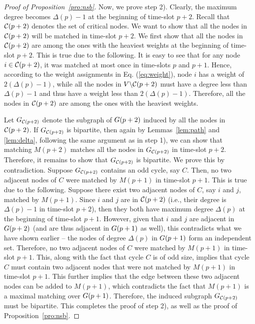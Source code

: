 \documentclass[10pt,journal,compsoc]{IEEEtran}
\begin{document}
\begin{proof}[Proof of Proposition~\ref{pro:nsb}]
Now, we prove step 2).
Clearly, the maximum degree becomes $\Delta(p)-1$ at the beginning of time-slot $p+2$. Recall
that $\mathcal{C}(p+2)$ denotes the set of critical nodes. We want to show that all the nodes in 
$\mathcal{C}(p+2)$ will be matched in time-slot $p+2$. We first show that all the nodes in $\mathcal{C}(p+2)$ 
are among the ones with the heaviest weights at the beginning of time-slot $p+2$. This is true 
due to the following. It is easy to see that for any node $i \in \mathcal{C}(p+2)$, it was matched at most 
once in time-slots $p$ and $p+1$. Hence, according to the weight assignments in Eq. (\ref{eq:weight}), 
node $i$ has a weight of $2(\Delta(p)-1)$, while all the nodes in $V \backslash \mathcal{C}(p+2)$ must 
have a degree less than $\Delta(p)-1$ and thus have a weight less than $2(\Delta(p)-1)$. Therefore, 
all the nodes in $\mathcal{C}(p+2)$ are among the ones with the heaviest weights.

Let $G_{\mathcal{C}(p+2)}$ denote the subgraph of $G(p+2)$ induced by all the nodes in 
$\mathcal{C}(p+2)$. If $G_{\mathcal{C}(p+2)}$ is bipartite, then again by Lemmas~\ref{lem:path} 
and \ref{lem:delta}, following the same argument as in step 1), we can show that matching 
$M(p+2)$ matches all the nodes in $G_{\mathcal{C}(p+2)}$ in time-slot $p+2$. Therefore, it 
remains to show that $G_{\mathcal{C}(p+2)}$ is bipartite. We prove this by contradiction. 
Suppose $G_{\mathcal{C}(p+2)}$ contains an odd cycle, say $C$. Then, no two adjacent nodes 
of $C$ were matched by $M(p+1)$ in time-slot $p+1$. This is true due to the following. 
Suppose there exist two adjacent nodes of $C$, say $i$ and $j$, matched by $M(p+1)$. 
Since $i$ and $j$ are in $\mathcal{C}(p+2)$ (i.e., their degree is $\Delta(p)-1$ in time-slot $p+2$), then
they both have maximum degree $\Delta(p)$ at the beginning of time-slot $p+1$. However, given 
that $i$ and $j$ are adjacent in $G(p+2)$ (and are thus adjacent in $G(p+1)$ as well), 
this contradicts what we have shown earlier -- the nodes of degree $\Delta(p)$ in $G(p+1)$ 
form an independent set. Therefore, no two adjacent nodes of $C$ were matched by $M(p+1)$ 
in time-slot $p+1$. This, along with the fact that cycle $C$ is of odd size, implies that cycle $C$ 
must contain two adjacent nodes that were not matched by $M(p+1)$ in time-slot $p+1$. This 
further implies that the edge between these two adjacent nodes can be added to $M(p+1)$, 
which contradicts the fact that $M(p+1)$ is a maximal matching over $G(p+1)$. Therefore, 
the induced subgraph $G_{\mathcal{C}(p+2)}$ must be bipartite. This completes the proof of step 2), 
as well as the proof of Proposition~\ref{pro:nsb}.
\end{proof}
\end{document}
